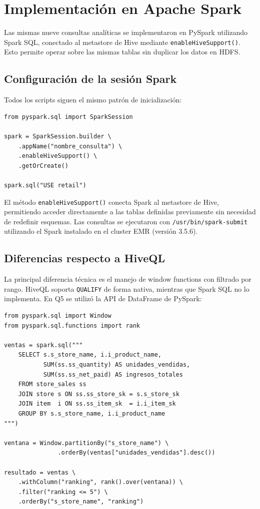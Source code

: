 
\section{Implementación en Apache Spark}

Las mismas nueve consultas analíticas se implementaron en PySpark utilizando Spark SQL,
conectado al metastore de Hive mediante \texttt{enableHiveSupport()}. Esto permite operar
sobre las mismas tablas sin duplicar los datos en HDFS.

\subsection{Configuración de la sesión Spark}

Todos los scripts siguen el mismo patrón de inicialización:

\begin{lstlisting}[style=python, caption={Inicialización de SparkSession con soporte Hive}]
from pyspark.sql import SparkSession

spark = SparkSession.builder \
    .appName("nombre_consulta") \
    .enableHiveSupport() \
    .getOrCreate()

spark.sql("USE retail")
\end{lstlisting}

El método \texttt{enableHiveSupport()} conecta Spark al metastore de Hive, permitiendo
acceder directamente a las tablas definidas previamente sin necesidad de redefinir esquemas.
Las consultas se ejecutaron con \texttt{/usr/bin/spark-submit} utilizando el Spark
instalado en el cluster EMR (versión 3.5.6).

\subsection{Diferencias respecto a HiveQL}

La principal diferencia técnica es el manejo de window functions con filtrado por rango.
HiveQL soporta \texttt{QUALIFY} de forma nativa, mientras que Spark SQL no lo implementa.
En Q5 se utilizó la API de DataFrame de PySpark:

\begin{lstlisting}[style=python, caption={Q5 en Spark: top productos por tienda sin QUALIFY}]
from pyspark.sql import Window
from pyspark.sql.functions import rank

ventas = spark.sql("""
    SELECT s.s_store_name, i.i_product_name,
           SUM(ss.ss_quantity) AS unidades_vendidas,
           SUM(ss.ss_net_paid) AS ingresos_totales
    FROM store_sales ss
    JOIN store s ON ss.ss_store_sk = s.s_store_sk
    JOIN item  i ON ss.ss_item_sk  = i.i_item_sk
    GROUP BY s.s_store_name, i.i_product_name
""")

ventana = Window.partitionBy("s_store_name") \
               .orderBy(ventas["unidades_vendidas"].desc())

resultado = ventas \
    .withColumn("ranking", rank().over(ventana)) \
    .filter("ranking <= 5") \
    .orderBy("s_store_name", "ranking")
\end{lstlisting}

